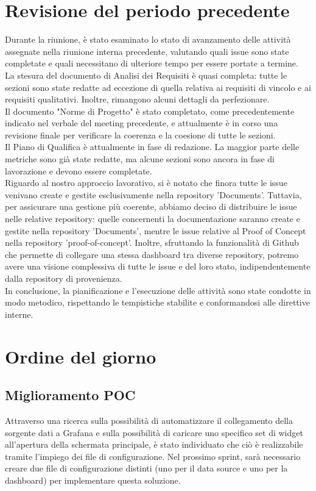 \documentclass{article}
\begin{document}
\section{Revisione del periodo precedente}
Durante la riunione, è stato esaminato lo stato di avanzamento delle attività assegnate nella riunione interna precedente, valutando quali issue sono state completate e quali necessitano di ulteriore tempo per essere portate a termine. \\
La stesura del documento di Analisi dei Requisiti è quasi completa: tutte le sezioni sono state redatte ad eccezione di quella relativa ai requisiti di vincolo e ai requisiti qualitativi. Inoltre, rimangono alcuni dettagli da perfezionare. \\
Il documento "Norme di Progetto" è stato completato, come precedentemente indicato nel verbale del meeting precedente, e attualmente è in corso una revisione finale per verificare la coerenza e la coesione di tutte le sezioni. \\
Il Piano di Qualifica è attualmente in fase di redazione. La maggior parte delle metriche sono già state redatte, ma alcune sezioni sono ancora in fase di lavorazione e devono essere completate. \\
Riguardo al nostro approccio lavorativo, si è notato che finora tutte le issue venivano create e gestite esclusivamente nella repository 'Documents'. Tuttavia, per assicurare una gestione più coerente, abbiamo deciso di distribuire le issue nelle relative repository: quelle concernenti la documentazione saranno create e gestite nella repository 'Documents', mentre le issue relative al Proof of Concept nella repository 'proof-of-concept'. Inoltre, sfruttando la funzionalità di Github che permette di collegare una stessa dashboard tra diverse repository, potremo avere una visione complessiva di tutte le issue e del loro stato, indipendentemente dalla repository di provenienza. \\
In conclusione, la pianificazione e l'esecuzione delle attività sono state condotte in modo metodico, rispettando le tempistiche stabilite e conformandosi alle direttive interne.

\section{Ordine del giorno}
    \subsection{Miglioramento POC}
    Attraverso una ricerca sulla possibilità di automatizzare il collegamento della sorgente dati a Grafana e sulla possibilità di caricare uno specifico set di widget all'apertura della schermata principale, è stato individuato che ciò è realizzabile tramite l'impiego dei file di configurazione. Nel prossimo sprint, sarà necessario creare due file di configurazione distinti (uno per il data source e uno per la dashboard) per implementare questa soluzione.
\end{document}
